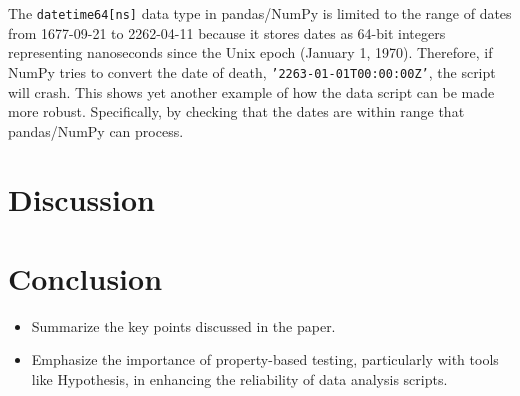 \documentclass[runningheads]{llncs}
\begin{document}
The \texttt{datetime64[ns]} data type in pandas/NumPy is limited to the range of dates from 1677-09-21 to 2262-04-11 because it stores dates as 64-bit integers representing nanoseconds since the Unix epoch (January 1, 1970). Therefore, if NumPy tries to convert the date of death, \texttt{'2263-01-01T00:00:00Z'}, the script will crash. This shows yet another example of how the data script can be made more robust. Specifically, by checking that the dates are within range that pandas/NumPy can process.

\section{Discussion}

\section{Conclusion}
\begin{itemize}
  \item Summarize the key points discussed in the paper.
  \item Emphasize the importance of property-based testing, particularly with tools like Hypothesis, in enhancing the reliability of data analysis scripts.
\end{itemize}
%
%
%


\end{document}
